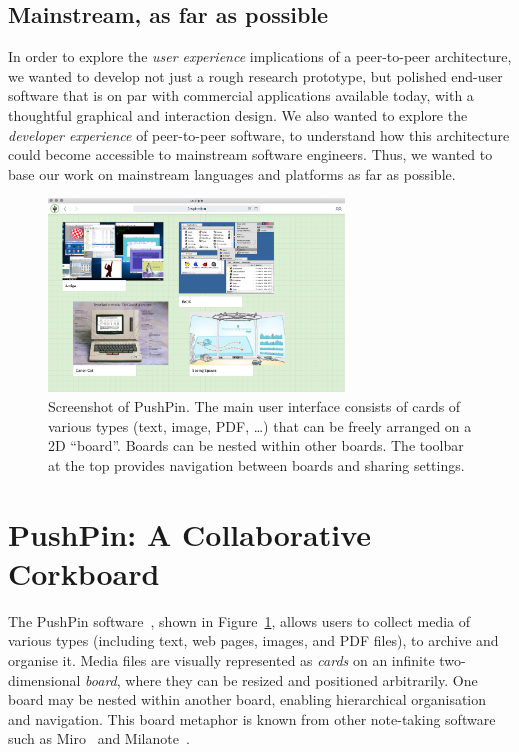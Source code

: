 \documentclass[sigplan,10pt]{acmart}
\begin{document}
\subsection{Mainstream, as far as possible}

In order to explore the \emph{user experience} implications of a peer-to-peer architecture, we wanted to develop not just a rough research prototype, but polished end-user software that is on par with commercial applications available today, with a thoughtful graphical and interaction design.
We also wanted to explore the \emph{developer experience} of peer-to-peer software, to understand how this architecture could become accessible to mainstream software engineers.
Thus, we wanted to base our work on mainstream languages and platforms as far as possible.

\begin{figure}
    \centering
    \includegraphics[width=0.7\textwidth]{pushpin.jpg}
    \caption{Screenshot of PushPin. The main user interface consists of cards of various types (text, image, PDF, \dots) that can be freely arranged on a 2D ``board''. Boards can be nested within other boards. The toolbar at the top provides navigation between boards and sharing settings.}
    \label{fig:pushpin}
\end{figure}

\section{PushPin: A Collaborative Corkboard}\label{sec:pushpin}

The PushPin software~\cite{PushPinSource}, shown in Figure~\ref{fig:pushpin}, allows users to collect media of various types (including text, web pages, images, and PDF files), to archive and organise it.
Media files are visually represented as \emph{cards} on an infinite two-dimensional \emph{board}, where they can be resized and positioned arbitrarily.
One board may be nested within another board, enabling hierarchical organisation and navigation.
This board metaphor is known from other note-taking software such as Miro~\cite{Miro} and Milanote~\cite{Milanote}.
\end{document}
